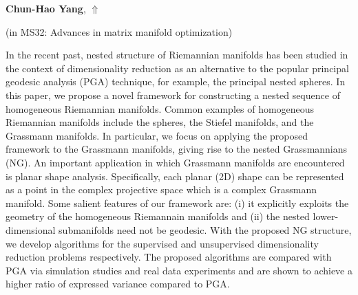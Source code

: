 \documentclass[ILAS2025-program.tex]{subfiles}
\begin{document}
\hypertarget{down0185}{}\begin{ilasabstract}
    
\textbf{Chun-Hao Yang},  \hfill \hyperlink{up0185}{$\Uparrow$}
    
    
(in {\color{mstitle}MS32: Advances in matrix manifold optimization})
        
\mtskip
    In the recent past, nested structure of Riemannian manifolds has been studied in the context of dimensionality reduction as an alternative to the popular principal geodesic analysis (PGA) technique, for example, the principal nested spheres. In this paper, we propose a novel framework for constructing a nested sequence of homogeneous Riemannian manifolds. Common examples of homogeneous Riemannian manifolds include the spheres, the Stiefel manifolds, and the Grassmann manifolds. In particular, we focus on applying the proposed framework to the Grassmann manifolds, giving rise to the nested Grassmannians (NG). An important application in which Grassmann manifolds are encountered is planar shape analysis. Specifically, each planar (2D) shape can be represented as a point in the complex projective space which is a complex Grassmann manifold. Some salient features of our framework are: (i) it explicitly exploits the geometry of the homogeneous Riemannain manifolds and (ii) the nested lower-dimensional submanifolds need not be geodesic. With the proposed NG structure, we develop algorithms for the supervised and unsupervised dimensionality reduction problems respectively. The proposed algorithms are compared with PGA via simulation studies and real data experiments and are shown to achieve a higher ratio of expressed variance compared to PGA.

\end{ilasabstract}
    
\end{document}
